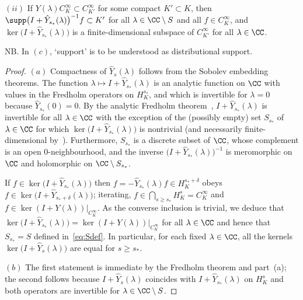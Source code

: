 \begin{Theorem}
\begin{enumerate}
 		$(ii)$ If $Y(\lambda)C^\infty_K\subset C^\infty_{K'}$ for some compact $K'\subset K$, then
 		$\supp \big(I+ \hat{Y}_{s_*}(\lambda)\big)^{-1}f\subset K'$ for all $\lambda\in \CC\setminus S$ and all $f\in C^\infty_K$, and
 		$\ker \big(I+ \hat{Y}_{s_*}(\lambda)\big)$ is a finite-dimensional subspace of
 		$C^\infty_{K'}$ for all $\lambda\in\CC$.
 		
 		NB. In $(c)$, `support' is to be understood as distributional support.
 	\end{enumerate}
 \end{Theorem}
 \begin{proof}
 	$(a)$ Compactness of $\hat{Y}_s(\lambda)$ follows from the Sobolev embedding theorems.
 	The function $\lambda\mapsto I+ \hat{Y}_{s_*}(\lambda)$ is an analytic function on $\CC$ with values in the Fredholm operators on $H^{s_*}_K$, and which is invertible for $\lambda=0$ because $\hat{Y}_{s_*}(0)=0$. By the analytic Fredholm theorem~\cite[Theorem VI.14]{ReedSimon:vol1}, $I+ \hat{Y}_{s_*}(\lambda)$ is invertible for all $\lambda\in\CC$ with the exception of the (possibly empty) set $S_{s_*}$ of $\lambda\in \CC$ for which $\ker \big(I+ \hat{Y}_{s_*}(\lambda)\big)$ is nontrivial (and necessarily finite-dimensional by~\cite[Theorem VI.15]{ReedSimon:vol1}). Furthermore, $S_{s_*}$ is a
 	discrete subset of $\CC$, whose complement is an open $0$-neighbourhood, and the inverse $\big(I+ \hat{Y}_{s_*}(\lambda)\big)^{-1}$ is meromorphic on $\CC$ and holomorphic on $\CC\setminus S_{s_*}$.
 	
 	If $f\in\ker \big(I+\hat{Y}_{s_*}(\lambda)\big)$ then $f = - \hat{Y}_{s_*}(\lambda)f\in H^{s_*+\delta}_K$ obeys $f\in\ker \big(I+ \hat{Y}_{s_*+\delta}(\lambda)\big)$; iterating, $f\in \bigcap_{s\ge s_*} H^s_K=C^\infty_K$ and $f\in \ker (I+ Y(\lambda))|_{C^\infty_K}$.
 	As the converse inclusion is trivial, we deduce that
 	$\ker \big(I+\hat{Y}_{s_*}(\lambda)\big)= \ker (I+ Y(\lambda))|_{C^\infty_K}$
 	for all $\lambda\in \CC$ and hence that $S_{s_*}=S$ defined in~\eqref{eq:Sdef}. In particular, for each fixed $\lambda\in\CC$, all the kernels $\ker \big(I+\hat{Y}_{s}(\lambda)\big)$ are equal for $s\ge s_*$.
 	
 	$(b)$ The first statement is immediate by the Fredholm theorem and part~(a); the second follows because $I+\hat{Y}_{s}(\lambda)$ coincides with $I+ \hat{Y}_{s_*}(\lambda)$ on $H^s_K$ and both operators are invertible for $\lambda\in\CC\setminus S$.
 	

\end{proof}
